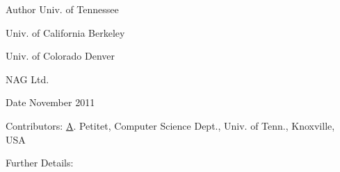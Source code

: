 \begin{DoxyAuthor}{Author}
Univ. of Tennessee 

Univ. of California Berkeley 

Univ. of Colorado Denver 

N\+A\+G Ltd. 
\end{DoxyAuthor}
\begin{DoxyDate}{Date}
November 2011 
\end{DoxyDate}
\begin{DoxyParagraph}{Contributors\+: }
\hyperlink{classA}{A}. Petitet, Computer Science Dept., Univ. of Tenn., Knoxville, U\+S\+A 
\end{DoxyParagraph}
\begin{DoxyParagraph}{Further Details\+: }
\begin{DoxyVerb} \end{DoxyVerb}
 
\end{DoxyParagraph}
